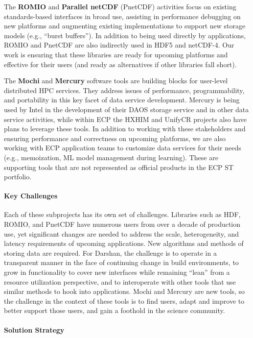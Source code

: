 The \textbf{ROMIO} and \textbf{Parallel netCDF} (PnetCDF) activities
focus on existing standards-based interfaces in broad use, assisting
in performance debugging on new platforms and augmenting existing
implementations to support new storage models (e.g., “burst
buffers”). In addition to being used directly by applications, ROMIO
and PnetCDF are also indirectly used in HDF5 and netCDF-4. Our work is
ensuring that these libraries are ready for upcoming platforms and
effective for their users (and ready as alternatives if other
libraries fall short).

The \textbf{Mochi} and \textbf{Mercury} software tools are building blocks for
user-level distributed HPC services. They address issues of
performance, programmability, and portability in this key facet of
data service development. Mercury is being used by Intel in the
development of their DAOS storage service and in other data service
activities, while within ECP the HXHIM and UnifyCR projects also have
plans to leverage these tools. In addition to working with these
stakeholders and ensuring performance and correctness on upcoming
platforms, we are also working with ECP application teams to customize
data services for their needs (e.g., memoization, ML model management
during learning). These are supporting tools that are not represented as 
official products in the ECP ST portfolio.

\paragraph{Key Challenges}

Each of these subprojects has its own set of challenges. Libraries
such as HDF, ROMIO, and PnetCDF have numerous users from over a decade of
production use, yet significant changes are needed to address the
scale, heterogeneity, and latency requirements of upcoming
applications. New algorithms and methods of storing data are required.
%
For Darshan, the challenge is to operate in a transparent manner in
the face of continuing change in build environments, to grow in
functionality to cover new interfaces while remaining ``lean'' from a
resource utilization perspective, and to interoperate with other tools
that use similar methods to hook into applications.
%
Mochi and Mercury are new tools, so the challenge in the context of
these tools is to find users, adapt and improve to better support
those users, and gain a foothold in the science community.

\paragraph{Solution Strategy}

